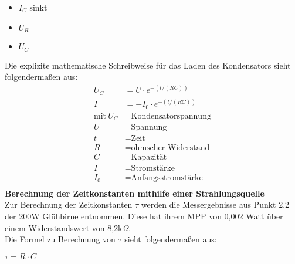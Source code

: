 \begin{itemize}
\item $I_C$ sinkt
\end{itemize}
\begin{itemize}
\item $U_R$
\end{itemize}
\begin{itemize}
\item $U_C$
\end{itemize}
Die explizite mathematische Schreibweise für das Laden des Kondensators sieht folgendermaßen aus:
\begin{align*}
U_C &= U \cdot e^{-(t/(RC))}\\
I &= -I_0 \cdot e^{-(t/(RC))}\\
\text{mit} \ U_C &= \text{Kondensatorspannung}\\
U &= \text{Spannung}\\
t &= \text{Zeit}\\
R &= \text{ohmscher Widerstand}\\
C &= \text{Kapazität}\\
I &= \text{Stromstärke}\\
I_0 &= \text{Anfangsstromstärke}\\
\end{align*}
\textbf{Berechnung der Zeitkonstanten mithilfe einer Strahlungsquelle}\\
Zur Berechnung der Zeitkonstanten $\tau$ werden die Messergebnisse aus Punkt 2.2 der 200W Glühbirne entnommen. Diese hat ihrem MPP von 0,002 Watt über einem Widerstandswert von 8,2k$\Omega$.\\
Die Formel zu Berechnung von $\tau$ sieht folgendermaßen aus:\\
\begin{center}
$\tau = R \cdot C$
\end{center}


